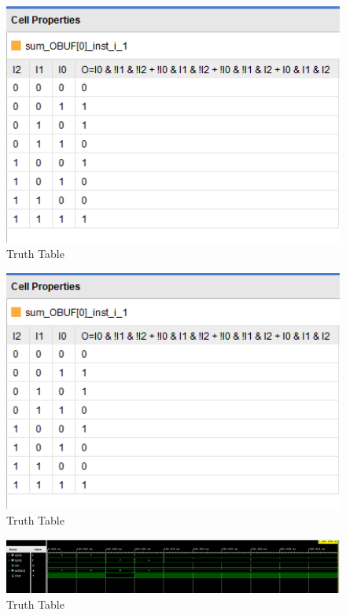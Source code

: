 \documentclass{article}
\begin{document}
\begin{figure}[h]
\begin{center}
\includegraphics[width=1\textwidth]{fourBitAdderTruth4.png} %
\caption{Truth Table}
\end{center}
\end{figure}



\begin{figure}[h]
\begin{center}
\includegraphics[width=1\textwidth]{fourBitAdderTruth4.png} %
\caption{Truth Table}
\end{center}
\end{figure}

\begin{figure}[h]
\begin{center}
\includegraphics[width=1\textwidth]{fourBitAdderWaveForm.png} %
\caption{Truth Table}
\end{center}
\end{figure}
\end{document}
